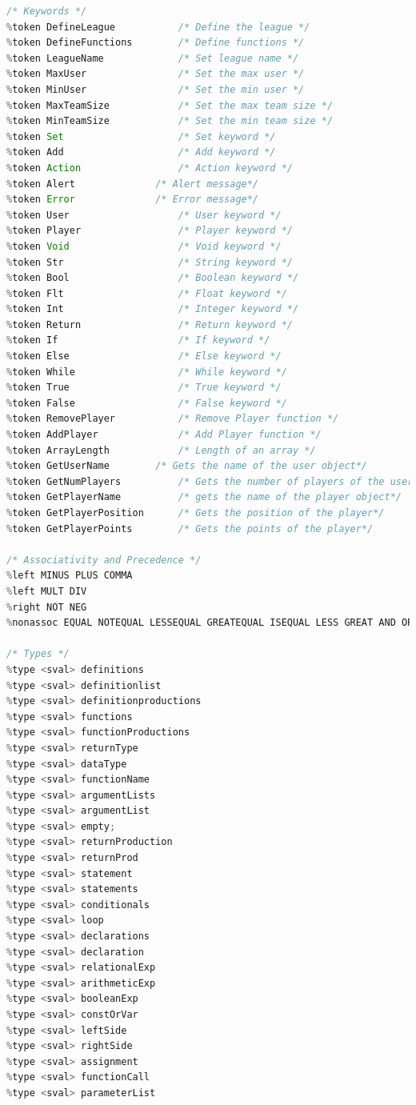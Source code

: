\documentclass[12pt]{report}
\begin{document}
\begin{singlespace}
\begin{lstlisting}[language=Java,label=some-code,caption={flood$\_$grammar.y}]
/* Keywords */
%token DefineLeague           /* Define the league */
%token DefineFunctions        /* Define functions */
%token LeagueName             /* Set league name */
%token MaxUser                /* Set the max user */
%token MinUser                /* Set the min user */
%token MaxTeamSize            /* Set the max team size */
%token MinTeamSize            /* Set the min team size */
%token Set                    /* Set keyword */
%token Add                    /* Add keyword */
%token Action                 /* Action keyword */
%token Alert		      /* Alert message*/
%token Error		      /* Error message*/
%token User                   /* User keyword */
%token Player                 /* Player keyword */
%token Void                   /* Void keyword */
%token Str                    /* String keyword */
%token Bool                   /* Boolean keyword */
%token Flt                    /* Float keyword */
%token Int                    /* Integer keyword */
%token Return                 /* Return keyword */
%token If                     /* If keyword */
%token Else                   /* Else keyword */
%token While                  /* While keyword */
%token True                   /* True keyword */
%token False                  /* False keyword */
%token RemovePlayer           /* Remove Player function */
%token AddPlayer              /* Add Player function */
%token ArrayLength            /* Length of an array */
%token GetUserName	      /* Gets the name of the user object*/
%token GetNumPlayers          /* Gets the number of players of the user*/
%token GetPlayerName          /* gets the name of the player object*/
%token GetPlayerPosition      /* Gets the position of the player*/
%token GetPlayerPoints        /* Gets the points of the player*/

/* Associativity and Precedence */
%left MINUS PLUS COMMA
%left MULT DIV
%right NOT NEG
%nonassoc EQUAL NOTEQUAL LESSEQUAL GREATEQUAL ISEQUAL LESS GREAT AND OR MOD DOT

/* Types */
%type <sval> definitions
%type <sval> definitionlist
%type <sval> definitionproductions
%type <sval> functions
%type <sval> functionProductions
%type <sval> returnType
%type <sval> dataType
%type <sval> functionName
%type <sval> argumentLists
%type <sval> argumentList
%type <sval> empty;
%type <sval> returnProduction
%type <sval> returnProd
%type <sval> statement
%type <sval> statements
%type <sval> conditionals
%type <sval> loop
%type <sval> declarations
%type <sval> declaration
%type <sval> relationalExp
%type <sval> arithmeticExp
%type <sval> booleanExp
%type <sval> constOrVar
%type <sval> leftSide
%type <sval> rightSide
%type <sval> assignment
%type <sval> functionCall
%type <sval> parameterList


\end{lstlisting}
\end{singlespace}
\end{document}
